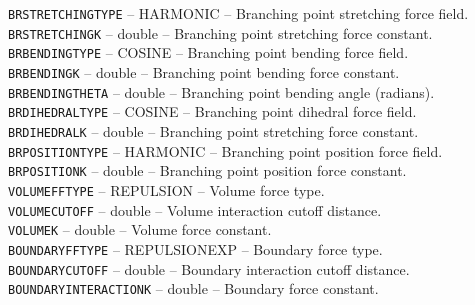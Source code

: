 \documentclass[11pt, oneside]{article}   	%
\begin{document}
     \noindent \texttt{BRSTRETCHINGTYPE} -- HARMONIC -- Branching point stretching force field. \\
   
     \noindent \texttt{BRSTRETCHINGK} -- double -- Branching point stretching force constant. \\
   
    \noindent  \texttt{BRBENDINGTYPE} -- COSINE -- Branching point bending force field. \\
   
    \noindent \texttt{BRBENDINGK} -- double -- Branching point bending force constant. \\
    
    \noindent \texttt{BRBENDINGTHETA} -- double -- Branching point bending angle (radians). \\
   
    \noindent \texttt{BRDIHEDRALTYPE} -- COSINE -- Branching point dihedral force field. \\
   
     \noindent \texttt{BRDIHEDRALK} -- double -- Branching point stretching force constant. \\
   
     \noindent \texttt{BRPOSITIONTYPE} -- HARMONIC -- Branching point position force field.\\
   
     \noindent \texttt{BRPOSITIONK} -- double -- Branching point position force constant. \\
   
     \noindent \texttt{VOLUMEFFTYPE} -- REPULSION -- Volume force type. \\
   
    \noindent  \texttt{VOLUMECUTOFF} -- double -- Volume interaction cutoff distance.\\
   
    \noindent  \texttt{VOLUMEK} -- double -- Volume force constant. \\
   
     \noindent \texttt{BOUNDARYFFTYPE} -- REPULSIONEXP -- Boundary force type. \\
   
      \noindent \texttt{BOUNDARYCUTOFF} -- double -- Boundary interaction cutoff distance.\\
   
     \noindent \texttt{BOUNDARYINTERACTIONK} -- double -- Boundary force constant. \\
   
\end{document}
